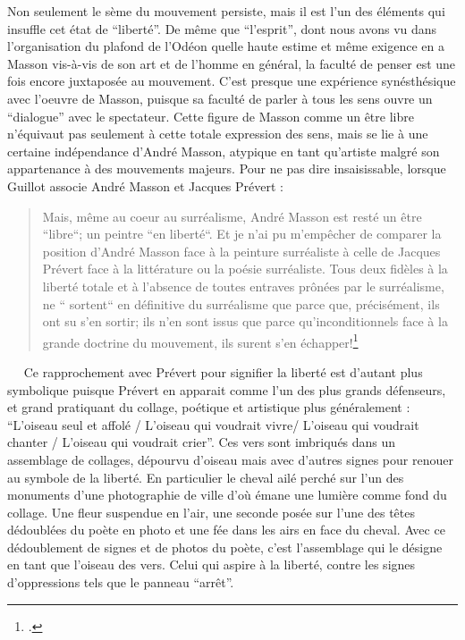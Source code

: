 	Non seulement le sème du mouvement persiste, mais il est l’un des éléments qui insuffle cet état de \enquote{liberté}. De même que \enquote{l’esprit}, dont nous avons vu dans l’organisation du plafond de l’Odéon quelle haute estime et même exigence en a Masson vis-à-vis de son art et de l’homme en général, la faculté de penser est une fois encore juxtaposée au mouvement. C’est presque une expérience synésthésique avec l’oeuvre de Masson, puisque sa faculté de parler à tous les sens ouvre un \enquote{dialogue} avec le spectateur. Cette figure de Masson comme un être libre n’équivaut pas seulement à cette totale expression des sens, mais se lie à une certaine indépendance d’André Masson, atypique en tant qu’artiste malgré son appartenance à des mouvements majeurs. Pour ne pas dire insaisissable, lorsque Guillot associe André Masson et Jacques Prévert : 
\begin{quote}
Mais, même au coeur au surréalisme, André Masson est resté un être “libre“; un peintre “en liberté“. Et je n’ai pu m’empêcher de comparer la position d’André Masson face à la peinture surréaliste à celle de Jacques Prévert face à la littérature ou la poésie surréaliste. Tous deux fidèles à la liberté totale et à l’absence de toutes entraves prônées par le surréalisme, ne “ sortent“ en définitive du surréalisme que parce que, précisément, ils ont su s’en sortir; ils n’en sont issus que parce qu’inconditionnels face à la grande doctrine du mouvement, ils surent s’en échapper!\footcite{massonlyon}\end{quote}
  
Ce rapprochement avec Prévert pour signifier la liberté est d’autant plus symbolique puisque Prévert en apparait comme l’un des plus grands défenseurs, et grand pratiquant du collage, poétique et artistique plus généralement : \enquote{L’oiseau seul et affolé / L’oiseau qui voudrait vivre/ L’oiseau qui voudrait chanter / L’oiseau qui voudrait crier}. Ces vers sont imbriqués dans un assemblage de collages, dépourvu d’oiseau mais avec d’autres signes pour renouer au symbole de la liberté. En particulier le cheval ailé perché sur l’un des monuments d’une photographie de ville d’où émane une lumière comme fond du collage. Une fleur suspendue en l’air, une seconde posée sur l’une des têtes dédoublées du poète en photo et une fée dans les airs en face du cheval. Avec ce dédoublement de signes et de photos du poète, c’est l’assemblage qui le désigne en tant que l’oiseau des vers. Celui qui aspire à la liberté, contre les signes d’oppressions tels que le panneau \enquote{arrêt}. 

